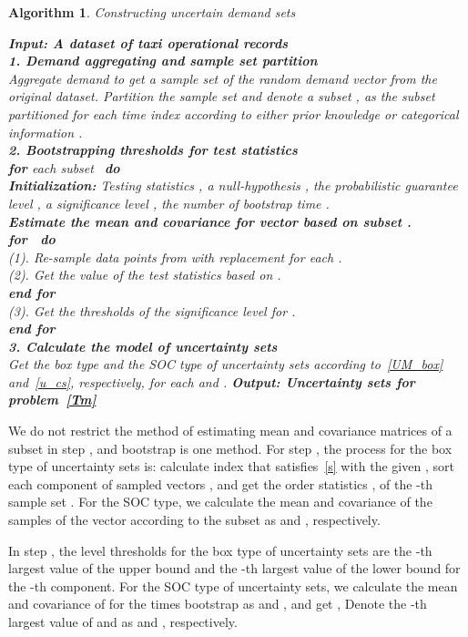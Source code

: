 \documentclass[10pt,twocolumn,twoside,english]{IEEEtran}
\newtheorem{algorithm}{Algorithm}
\begin{document}
\begin{algorithm}
\caption{Constructing uncertain demand sets}
\textbf{Input: A dataset of taxi operational records}\\
\textbf{1. Demand aggregating and sample set partition}\\
Aggregate demand to get a sample set  of the random demand vector  from the original dataset. Partition the sample set  and denote a subset ,  as the subset partitioned  for each time index  according to either prior knowledge or categorical information . \\\textbf{2. Bootstrapping thresholds for test statistics}
\\\textbf{for} each subset \ \textbf{do}
\\ \textbf{Initialization:} { Testing statistics , a null-hypothesis , the probabilistic guarantee level , a significance level , the number of bootstrap time .}\\\textbf{Estimate the mean  and covariance  for vector  based on subset .} 
\\ \quad \textbf{for}\ \ \textbf{do}
\\ \quad\quad (1). Re-sample  data points from  with replacement for each .
\\ \quad\quad (2). Get the value of the test statistics based on . \\ \quad \textbf{end for}
\\ \quad (3). Get the thresholds of the  significance level for .
\\ \quad \textbf{end for}
\\\textbf{3. Calculate the model of uncertainty sets}\\
Get the box type and the SOC type of uncertainty sets according to~\eqref{UM_box} and~\eqref{u_cs}, respectively, for each  and . 
\textbf{Output: Uncertainty sets for problem~\eqref{Tm}}
\label{alg: algorithm_1}
\end{algorithm}

We do not restrict the method of estimating  mean  and covariance  matrices of a subset  in step ,  and bootstrap is one method. For step , the process for the box type of uncertainty sets is: calculate index  that satisfies~\eqref{s} with the given , sort each component of sampled vectors , and get the order statistics ,  of the -th sample set . For the SOC type, we calculate the mean and covariance of the samples of the vector according to the subset  as  and , respectively.

In step , the  level thresholds for the box type of uncertainty sets are the -th largest value of the upper bound  and the -th largest value of the lower bound  for the -th component. For the SOC type of uncertainty sets, we calculate the mean and covariance of  for the  times bootstrap as  and , and get ,  Denote the -th largest value of  and as  and , respectively. 
\end{document}
